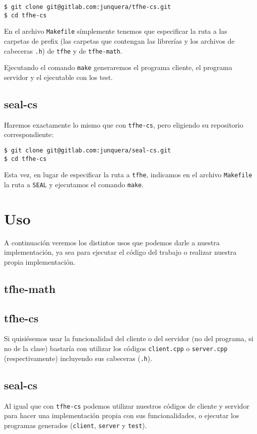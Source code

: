 \begin{verbatim}
$ git clone git@gitlab.com:junquera/tfhe-cs.git
$ cd tfhe-cs
\end{verbatim}

En el archivo \verb|Makefile| símplemente tenemos que especificar la ruta a las carpetas de prefix (las carpetas que contengan las librerías y los archivos de cabeceras \verb|.h|) de \verb|tfhe| y de \verb|tfhe-math|.

Ejecutando el comando \verb|make| generaremos el programa cliente, el programa servidor y el ejecutable con los test.

\subsection{seal-cs}

Haremos exactamente lo mismo que con \verb|tfhe-cs|, pero eligiendo su repositorio correspondiente:

\begin{verbatim}
$ git clone git@gitlab.com:junquera/seal-cs.git
$ cd tfhe-cs
\end{verbatim}

Esta vez, en lugar de especificar la ruta a \verb|tfhe|, indicamos en el archivo \verb|Makefile| la ruta a \verb|SEAL| y ejecutamos el comando \verb|make|.

\section{Uso}

A continuación veremos los distintos usos que podemos darle a nuestra implementación, ya sea para ejecutar el código del trabajo o realizar nuestra propia implementación.

\subsection{tfhe-math}



\subsection{tfhe-cs}

Si quisiésemos usar la funcionalidad del cliente o del servidor (no del programa, si no de la clase) bastaría con utilizar los códigos \verb|client.cpp| o \verb|server.cpp| (respectivamente) incluyendo sus cabeceras (\verb|.h|).

\subsection{seal-cs}

Al igual que con \verb|tfhe-cs| podemos utilizar nuestros códigos de cliente y servidor para hacer una implementación propia con sus funcionalidades, o ejecutar los programas generados (\verb|client|, \verb|server| y \verb|test|).
